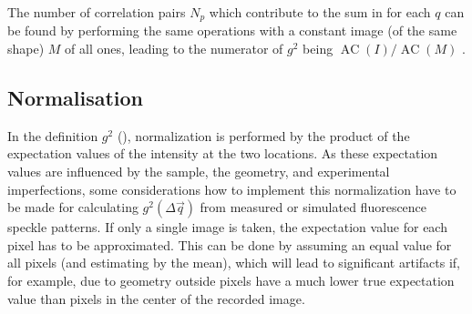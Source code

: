 The number of correlation pairs $N_p$ which contribute to the sum in  for each $q$ can be found by performing the same operations with a constant image (of the same shape) $M$ of all ones, leading to the numerator of $g^2$ being $\operatorname{AC}(I)/\operatorname{AC}(M)$ \cite{oppenheim2009,butz2015,nion2008}.

\subsection{Normalisation}
In the definition $g^2$ (), normalization is performed by the product of the expectation values of the intensity at the two locations. As these expectation values are influenced by the sample, the geometry, and experimental imperfections, some considerations how to implement this normalization have to be made for calculating $g^2(\Delta\vec{q})$ from measured or simulated fluorescence speckle patterns. 
If only a single image is taken, the expectation value for each pixel has to be approximated. This can be done by assuming an equal value for all pixels (and estimating by the mean), which will lead to significant artifacts if, for example, due to geometry outside pixels have a much lower true expectation value than pixels in the center of the recorded image.  

